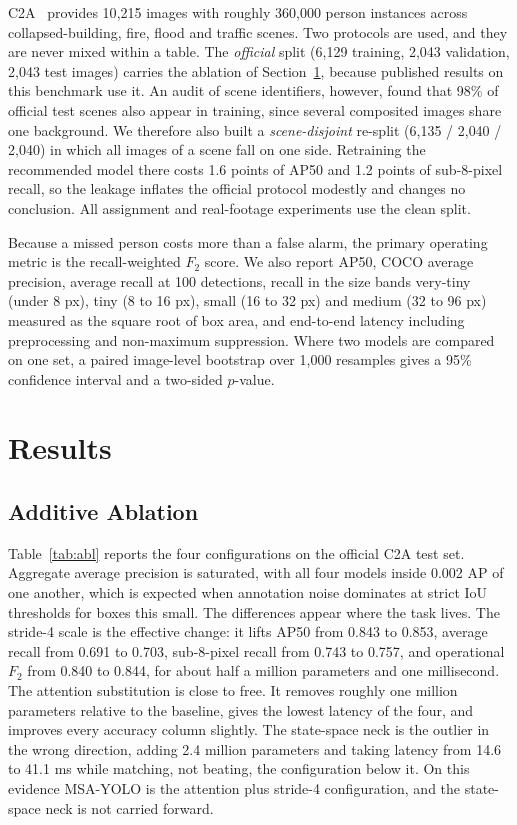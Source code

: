 \documentclass[conference,a4paper]{IEEEtran}
\begin{document}
C2A~\cite{nihal2024c2a} provides 10{,}215 images with roughly 360{,}000 person
instances across collapsed-building, fire, flood and traffic scenes. Two
protocols are used, and they are never mixed within a table. The
\emph{official} split (6{,}129 training, 2{,}043 validation, 2{,}043 test
images) carries the ablation of Section~\ref{sec:ablation}, because published
results on this benchmark use it. An audit of scene identifiers, however, found
that 98\% of official test scenes also appear in training, since several
composited images share one background. We therefore also built a
\emph{scene-disjoint} re-split (6{,}135 / 2{,}040 / 2{,}040) in which all images
of a scene fall on one side. Retraining the recommended model there costs 1.6
points of AP50 and 1.2 points of sub-8-pixel recall, so the leakage inflates the
official protocol modestly and changes no conclusion. All assignment and
real-footage experiments use the clean split.

Because a missed person costs more than a false alarm, the primary operating
metric is the recall-weighted $F_2$ score. We also report AP50, COCO average
precision, average recall at 100 detections, recall in the size bands very-tiny
(under 8 px), tiny (8 to 16 px), small (16 to 32 px) and medium (32 to 96 px)
measured as the square root of box area, and end-to-end latency including
preprocessing and non-maximum suppression. Where two models are compared on one
set, a paired image-level bootstrap over 1{,}000 resamples gives a 95\%
confidence interval and a two-sided $p$-value.

\section{Results}
\label{sec:ablation}

\subsection{Additive Ablation}
Table~\ref{tab:abl} reports the four configurations on the official C2A test
set. Aggregate average precision is saturated, with all four models inside 0.002
AP of one another, which is expected when annotation noise dominates at strict
IoU thresholds for boxes this small. The differences appear where the task
lives. The stride-4 scale is the effective change: it lifts AP50 from 0.843 to
0.853, average recall from 0.691 to 0.703, sub-8-pixel recall from 0.743 to
0.757, and operational $F_2$ from 0.840 to 0.844, for about half a million
parameters and one millisecond. The attention substitution is close to free. It
removes roughly one million parameters relative to the baseline, gives the
lowest latency of the four, and improves every accuracy column slightly. The
state-space neck is the outlier in the wrong direction, adding 2.4 million
parameters and taking latency from 14.6 to 41.1 ms while matching, not beating,
the configuration below it. On this evidence MSA-YOLO is the attention plus
stride-4 configuration, and the state-space neck is not carried forward.
\end{document}
